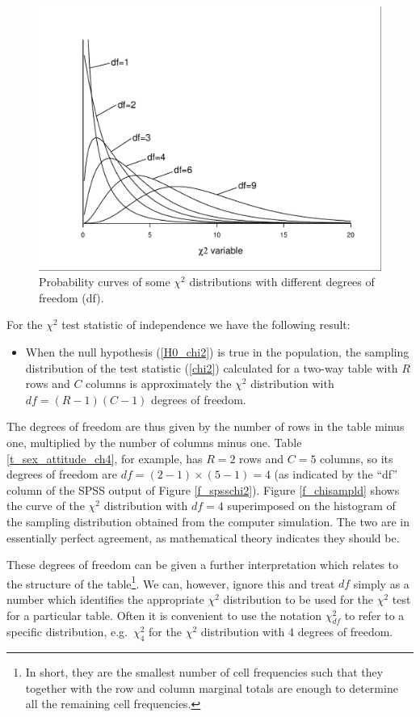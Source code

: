 \begin{figure}
\caption{Probability curves of some $\chi^{2}$ distributions with
different degrees of freedom (df).}
\label{f_chi2dists}

\begin{center}
\includegraphics[width=115mm]{chi2dists}
\end{center}

\end{figure}

For the $\chi^{2}$  test statistic of
independence we have the following result:
\begin{itemize}
\item
When the null hypothesis (\ref{H0_chi2}) is true in the population, the
sampling distribution of the test statistic (\ref{chi2}) calculated for
a two-way table with $R$ rows and $C$ columns is approximately the $\chi^{2}$
distribution with $df=(R-1)(C-1)$ degrees of freedom.
\end{itemize}
The degrees of freedom are thus given by the number of rows in the table
minus one, multiplied by the number of columns minus one. Table
\ref{t_sex_attitude_ch4}, for example, has $R=2$ rows and $C=5$ columns,
so its degrees of freedom are $df=(2-1)\times(5-1)=4$ (as indicated by
the ``df'' column of the SPSS output of Figure \ref{f_spsschi2}). Figure
\ref{f_chisampld} shows the curve of the $\chi^{2}$ distribution with
$df=4$ superimposed on the histogram of the sampling distribution
obtained from the computer simulation. The two are in essentially
perfect agreement, as mathematical theory indicates they should be.

These degrees of freedom can be given a further interpretation which
relates to the structure of the table\footnote{In short, they are the
smallest number of cell frequencies such that they together with the row
and column marginal totals are enough to determine all the remaining
cell frequencies.}. We can, however, ignore this and treat $df$ simply
as a number which identifies the appropriate $\chi^{2}$ distribution to
be used for the $\chi^{2}$ test for a particular table. Often it is
convenient to use the notation $\chi^{2}_{df}$ to refer to a specific
distribution, e.g.\ $\chi^{2}_{4}$ for  the $\chi^{2}$ distribution with
4 degrees of freedom.


